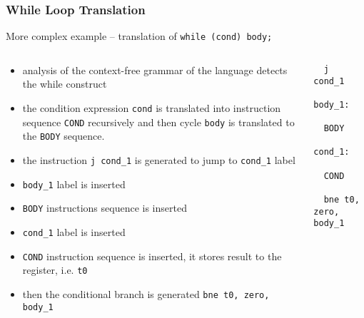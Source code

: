 \documentclass{beamer}
\begin{document}
\begin{frame}[fragile]
\frametitle{While Loop Translation}

More complex example -- translation of \texttt{while (cond) body;}
\begin{columns}
\begin{column}{0.7\textwidth}
\small
\begin{itemize}
 \setlength{\itemsep}{1pt}
 \item analysis of the context-free grammar of the language detects the while construct
 \item the condition expression \texttt{cond} is translated into instruction sequence \texttt{COND} recursively and then cycle \texttt{body} is translated to the \texttt{BODY} sequence.
 \item the instruction \texttt{j cond\_1} is generated to jump to \texttt{cond\_1} label
 \item \texttt{body\_1} label is inserted
 \item \texttt{BODY} instructions sequence is inserted
 \item \texttt{cond\_1} label is inserted
 \item \texttt{COND} instruction sequence is inserted, it stores result to the register, i.e. \texttt{t0}
 \item then the conditional branch is generated \texttt{bne t0, zero, body\_1}
\end{itemize}
\end{column}
\begin{column}{0.3\textwidth}  
\begin{verbatim}
  j  cond_1
    
body_1:

  BODY

cond_1:

  COND
    
  bne t0, zero, body_1
\end{verbatim}
\end{column}
\end{columns}

\end{frame}
\end{document}
